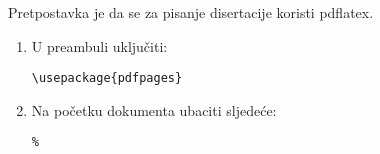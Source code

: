 \documentclass[a4paper,12pt]{article}
\begin{document}
\newpage
\strut \cleardoublepage




\newpage

\noindent 
Pretpostavka je da se za pisanje disertacije koristi pdflatex.

\begin{enumerate}
 \item 
\noindent U preambuli uključiti:
\begin{verbatim}
\usepackage{pdfpages}
\end{verbatim}


 \item 
\noindent Na početku dokumenta ubaciti sljedeće:
\begin{verbatim}
%
\end{verbatim}
\end{enumerate}
\end{document}
